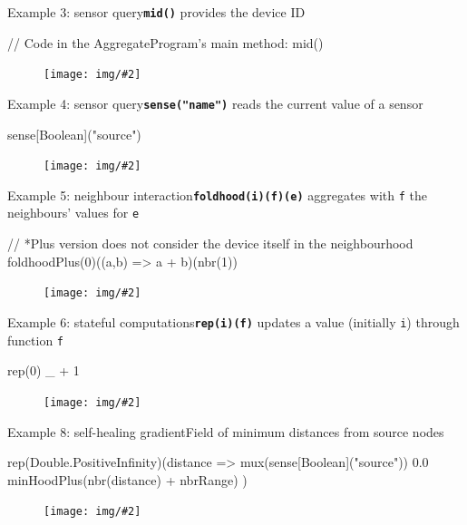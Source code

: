 \documentclass[presentation, 9pt]{beamer}\mode<presentation>{\usetheme{AMSBolognaFC}}
\newcommand{\imgv}[2]{
\begin{figure}
\centering
\texttt{[image: img/\#2]}
\end{figure}
}
\begin{document}
\begin{frame}[fragile]{Example 3: sensor query}{\textbf{\texttt{mid()}} provides the device ID}

\begin{mycode}{}{}{}
// Code in the AggregateProgram's main method:
mid()
\end{mycode}

\imgv{0.7}{example3-mid.png}

\end{frame}


\begin{frame}[fragile]{Example 4: sensor query}{\textbf{\texttt{sense("name")}} reads the current value of a sensor}

\begin{mycode}{}{}{}
sense[Boolean]("source")
\end{mycode}

\imgv{0.7}{example4-source.png}

\end{frame}

\begin{frame}[fragile]{Example 5: neighbour interaction}{\textbf{\texttt{foldhood(i)(f)(e)}} aggregates with \texttt{f} the neighbours' values for \texttt{e}}

\begin{mycode}{}{}{}
// *Plus version does not consider the device itself in the neighbourhood
foldhoodPlus(0)((a,b) => a + b)(nbr(1))
\end{mycode}

\imgv{0.7}{example5-fold.png}

\end{frame}


\begin{frame}[fragile]{Example 6: stateful computations}{\textbf{\texttt{rep(i)(f)}} updates a value (initially \texttt{i}) through function \texttt{f}}

\begin{mycode}{}{}{}
rep(0){ _ + 1 }
\end{mycode}

\imgv{0.7}{example6-rep.png}

\end{frame}


\begin{frame}[fragile]{Example 8: self-healing gradient}{Field of minimum distances from source nodes}

\begin{mycode}{}{}{}
rep(Double.PositiveInfinity)(distance =>
    mux(sense[Boolean]("source")) {
      0.0
    } {
      minHoodPlus(nbr(distance) + nbrRange)
    }
  )
\end{mycode}

\imgv{0.7}{example8-gradient.png}

\end{frame}
\end{document}
